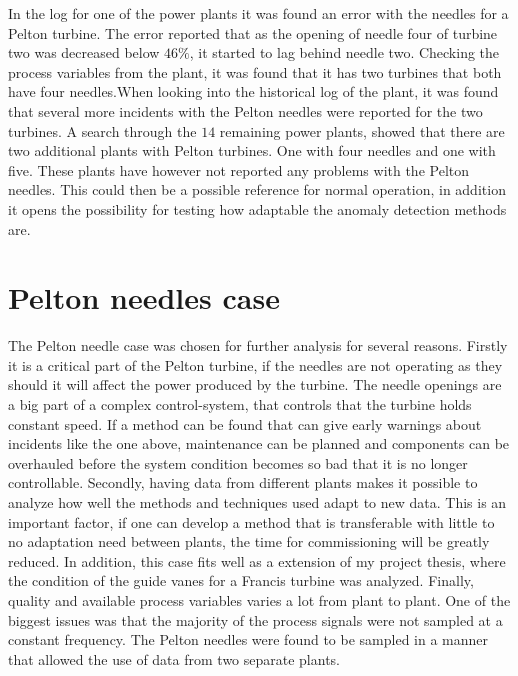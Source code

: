         In the log for one of the power plants it was found an error with the needles for a Pelton turbine. The error reported that as the opening of needle four of turbine two was decreased below $46\%$, it started to lag behind needle two. Checking the process variables from the plant, it was found that it has two turbines that both have four needles.When looking into the historical log of the plant, it was found that several more incidents with the Pelton needles were reported for the two turbines. A search through the $14$ remaining power plants, showed that there are two additional plants with Pelton turbines. One with four needles and one with five. These plants have however not reported any problems with the Pelton needles. This could then be a possible reference for normal operation, in addition it opens the possibility for testing how adaptable the anomaly detection methods are. 
        
\section{Pelton needles case}\label{sec:pelton_needles}
    The Pelton needle case was chosen for further analysis for several reasons. Firstly it is a critical part of the Pelton turbine, if the needles are not operating as they should it will affect the power produced by the turbine. The needle openings are a big part of a complex control-system, that controls that the turbine holds constant speed. If a method can be found that can give early warnings about incidents like the one above, maintenance can be planned and components can be overhauled before the system condition becomes so bad that it is no longer controllable. Secondly, having data from different plants makes it possible to analyze how well the methods and techniques used adapt to new data. This is an important factor, if one can develop a method that is transferable with little to no adaptation need between plants, the time for commissioning will be greatly reduced. In addition, this case fits well as a extension of my project thesis, where the condition of the guide vanes for a Francis turbine was analyzed. Finally, quality and available process variables varies a lot from plant to plant. One of the biggest issues was that the majority of the process signals were not sampled at a constant frequency. The Pelton needles were found to be sampled in a manner that allowed the use of data from two separate plants.
             

